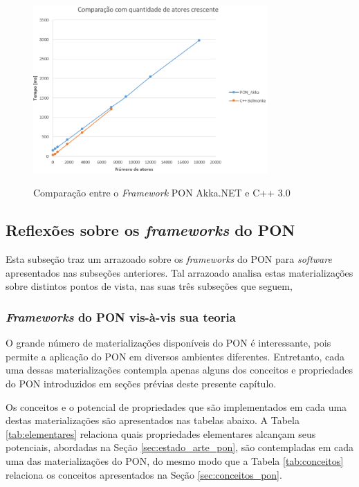 \begin{figure}[!htb]
  \centering
  \caption{Comparação entre o \textit{Framework} PON Akka.NET e C++ 3.0}
  \includegraphics[width=0.8\textwidth]{../figures/result_akka.png}
  \smallskip
  \label{fig:result_akka}
\end{figure}

\subsection{Reflexões sobre os \textit{frameworks} do PON}\label{sec:reflex}

Esta subseção traz um arrazoado sobre os \textit{frameworks} do PON para
\textit{software} apresentados nas subseções anteriores. Tal arrazoado analisa
estas materializações sobre distintos pontos de vista, nas suas três subseções
que seguem,

\subsubsection{\textit{Frameworks} do PON vis-à-vis sua teoria}

O grande número de materializações disponíveis do PON é interessante, pois
permite a aplicação do PON em diversos ambientes diferentes. Entretanto, cada
uma dessas materializações contempla apenas alguns dos conceitos e propriedades
do PON introduzidos em seções prévias deste presente capítulo.

Os conceitos e o potencial de propriedades que são implementados em cada uma
destas materializações são apresentados nas tabelas abaixo. A Tabela
\ref{tab:elementares} relaciona quais propriedades elementares alcançam seus
potenciais, abordadas na Seção \ref{sec:estado_arte_pon}, são contempladas em
cada uma das materializações do PON, do mesmo modo que a Tabela
\ref{tab:conceitos} relaciona os conceitos apresentados na Seção
\ref{sec:conceitos_pon}. 

